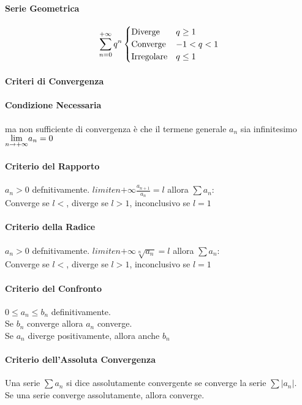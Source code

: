 \documentclass[12pt, a4paper, openany]{book}
\begin{document}
	\paragraph*{Serie Geometrica}
	\begin{equation*}
		\sum_{n=0}^{+\infty} q^n \begin{cases}
			\text{Diverge}    & q\geq 1 \\
			\text{Converge}   & -1<q<1  \\
			\text{Irregolare} & q\leq 1
		\end{cases}
	\end{equation*}
	\paragraph*{Criteri di Convergenza}
	\paragraph*{Condizione Necessaria} ma non sufficiente di convergenza è che il termene generale $a_n$ sia infinitesimo $\underset{n \to +\infty}{\lim} a_n = 0$

	\paragraph*{Criterio del Rapporto}
$a_n>0$ defnitivamente. $limite{n}{+\infty} \frac{a_{n+1}}{a_n}=l$ allora $\sum a_n$:
	\\Converge se $l<$, diverge se $l>1$, inconclusivo se $l=1$
	\paragraph*{Criterio della Radice}
$a_n>0$ defnitivamente. $limite{n}{+\infty} \sqrt[n]{a_n}=l$ allora $\sum a_n$:
	\\Converge se $l<$, diverge se $l>1$, inconclusivo se $l=1$
	\paragraph*{Criterio del Confronto}
$0\leq a_n \leq b_n$  definitivamente.
	\\Se $b_n$ converge allora $a_n$ converge.
	\\Se $a_n$ diverge positivamente, allora anche $b_n$
	\paragraph*{Criterio dell'Assoluta Convergenza}
	Una serie $\sum a_n$ si dice assolutamente convergente se converge la serie $\sum |a_n|$.
	\\Se una serie converge assolutamente, allora converge.
\end{document}
